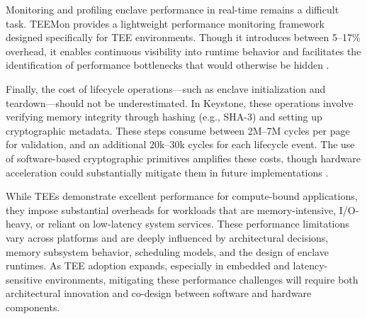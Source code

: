 Monitoring and profiling enclave performance in real-time remains a difficult task. TEEMon provides a lightweight performance monitoring framework designed specifically for TEE environments. Though it introduces between 5–17\% overhead, it enables continuous visibility into runtime behavior and facilitates the identification of performance bottlenecks that would otherwise be hidden \cite{krahn2020teemon}.

Finally, the cost of lifecycle operations—such as enclave initialization and teardown—should not be underestimated. In Keystone, these operations involve verifying memory integrity through hashing (e.g., SHA-3) and setting up cryptographic metadata. These steps consume between 2M–7M cycles per page for validation, and an additional 20k–30k cycles for each lifecycle event. The use of software-based cryptographic primitives amplifies these costs, though hardware acceleration could substantially mitigate them in future implementations \cite{dayeol2019keystone}.

While TEEs demonstrate excellent performance for compute-bound applications, they impose substantial overheads for workloads that are memory-intensive, I/O-heavy, or reliant on low-latency system services. These performance limitations vary across platforms and are deeply influenced by architectural decisions, memory subsystem behavior, scheduling models, and the design of enclave runtimes. As TEE adoption expands, especially in embedded and latency-sensitive environments, mitigating these performance challenges will require both architectural innovation and co-design between software and hardware components.


